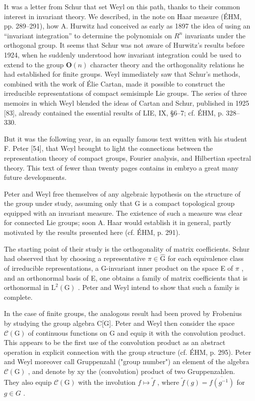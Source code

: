 It was a letter from Schur that set Weyl on this path, thanks to their common interest in invariant theory. We described, in the note on Haar measure (ÉHM, pp. 289–291), how A. Hurwitz had conceived as early as 1897 the idea of using an “invariant integration” to determine the polynomials on \(R^{n}\) invariants under the orthogonal group. It seems that Schur was not aware of Hurwitz's results before 1924, when he suddenly understood how invariant integration could be used to extend to the group \(\mathbf{O}(n)\) character theory and the orthogonality relations he had established for finite groups. Weyl immediately saw that Schur's methods, combined with the work of Élie Cartan, made it possible to construct the irreducible representations of compact semisimple Lie groups. The series of three memoirs in which Weyl blended the ideas of Cartan and Schur, published in 1925 {[}83{]}, already contained the essential results of LIE, IX, §6–7; cf. ÉHM, p. 328–330.

But it was the following year, in an equally famous text written with his student F. Peter {[}54{]}, that Weyl brought to light the connections between the representation theory of compact groups, Fourier analysis, and Hilbertian spectral theory. This text of fewer than twenty pages contains in embryo a great many future developments.

Peter and Weyl free themselves of any algebraic hypothesis on the structure of the group under study, assuming only that G is a compact topological group equipped with an invariant measure. The existence of such a measure was clear for connected Lie groups; soon A. Haar would establish it in general, partly motivated by the results presented here (cf. ÉHM, p. 291).

The starting point of their study is the orthogonality of matrix coefficients. Schur had observed that by choosing a representative \(\pi \in \widehat{\mathrm{G}}\) for each equivalence class of irreducible representations, a G-invariant inner product on the space E of \(\pi\) , and an orthonormal basis of E, one obtains a family of matrix coefficients that is orthonormal in \(\mathrm{L}^2 (\mathrm{G})\) . Peter and Weyl intend to show that such a family is complete.

In the case of finite groups, the analogous result had been proved by Frobenius by studying the group algebra C{[}G{]}. Peter and Weyl then consider the space \(\mathcal{C}(\mathrm{G})\) of continuous functions on G and equip it with the convolution product. This appears to be the first use of the convolution product as an abstract operation in explicit connection with the group structure (cf. ÉHM, p. 295). Peter and Weyl moreover call Gruppenzahl ("group number") an element of the algebra \(\mathcal{C}(\mathrm{G})\) , and denote by xy the (convolution) product of two Gruppenzahlen. They also equip \(\mathcal{C}(\mathrm{G})\) with the involution \(f \mapsto \widetilde{f}\) , where \(\widetilde{f}(g) = \overline{f(g^{-1})}\) for \(g \in G\) .

